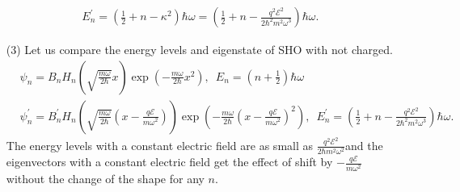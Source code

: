 \documentclass[floatfix,nofootinbib,superscriptaddress,fleqn]{revtex4-2}
\begin{document}
\begin{itemize}
\begin{align}
      E_n^\prime = \left(\frac{1}{2}+n-\kappa^2\right)\hbar\omega
      = \left(\frac{1}{2}+n
      -\frac{q^2\mathcal{E}^2}{2\hbar^2 m^2\omega^3}\right)
      \hbar\omega.
    \end{align}
  \item[(3)] Let us compare the energy levels 
  and eigenstate of SHO with not charged.
  \begin{align}
    &\psi_n = B_nH_n\left(\sqrt{\frac{m\omega}{2\hbar}}x\right)
    \exp{\left(-\frac{m\omega}{2\hbar}x^2\right)},\,\,\,
    E_n=\left(n+\frac{1}{2}\right)\hbar\omega \\
    &\psi_n^\prime=B^\prime_nH_n\left(\sqrt{\frac{m\omega}{2\hbar}}
    \left(x-\frac{q\mathcal{E}}{m\omega^2}\right)\right)
    \exp{\left(-\frac{m\omega}{2\hbar}\left(x
    -\frac{q\mathcal{E}}{m\omega^2}\right)^2\right)},\,\,\,
    E^\prime_n= \left(\frac{1}{2}+n
    -\frac{q^2\mathcal{E}^2}{2\hbar^2 m^2\omega^3}\right)\hbar\omega.
  \end{align}
  The energy levels with a constant electric field are as small as 
  $\frac{q^2\mathcal{E}^2}{2\hbar m^2\omega^2}$and the eigenvectors
  with a constant electric field get the effect of shift by 
  $-\frac{q\mathcal{E}}{m\omega^2}$ without the change of the shape 
  for any $n$.
  \end{itemize}

\vspace{0.5cm}
\end{document}

